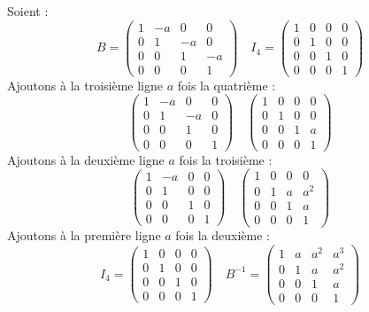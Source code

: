 {{	Soient :
	$$
	B=\left(\begin{array}{cccc}
		1 & -a & 0 & 0 \\
		0 & 1 & -a & 0 \\
		0 & 0 & 1 & -a \\
		0 & 0 & 0 & 1
	\end{array}\right) \quad I_4=\left(\begin{array}{cccc}
		1 & 0 & 0 & 0 \\
		0 & 1 & 0 & 0 \\
		0 & 0 & 1 & 0 \\
		0 & 0 & 0 & 1
	\end{array}\right)
	$$
	Ajoutons à la troisième ligne $a$ fois la quatrième :
	$$
	\left(\begin{array}{cccc}
		1 & -a & 0 & 0 \\
		0 & 1 & -a & 0 \\
		0 & 0 & 1 & 0 \\
		0 & 0 & 0 & 1
	\end{array}\right) \quad\left(\begin{array}{llll}
		1 & 0 & 0 & 0 \\
		0 & 1 & 0 & 0 \\
		0 & 0 & 1 & a \\
		0 & 0 & 0 & 1
	\end{array}\right)
	$$
	Ajoutons à la deuxième ligne $a$ fois la troisième :
	$$
	\left(\begin{array}{cccc}
		1 & -a & 0 & 0 \\
		0 & 1 & 0 & 0 \\
		0 & 0 & 1 & 0 \\
		0 & 0 & 0 & 1
	\end{array}\right) \quad\left(\begin{array}{cccc}
		1 & 0 & 0 & 0 \\
		0 & 1 & a & a^2 \\
		0 & 0 & 1 & a \\
		0 & 0 & 0 & 1
	\end{array}\right)
	$$
	Ajoutons à la première ligne $a$ fois la deuxième :
	$$
	I_4=\left(\begin{array}{cccc}
		1 & 0 & 0 & 0 \\
		0 & 1 & 0 & 0 \\
		0 & 0 & 1 & 0 \\
		0 & 0 & 0 & 1
	\end{array}\right) \quad B^{-1}=\left(\begin{array}{cccc}
		1 & a & a^2 & a^3 \\
		0 & 1 & a & a^2 \\
		0 & 0 & 1 & a \\
		0 & 0 & 0 & 1
	\end{array}\right)
	$$
 }}
